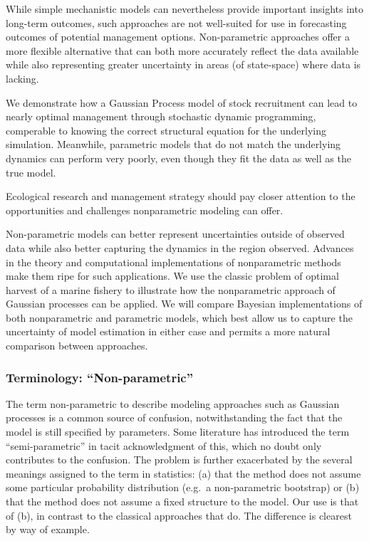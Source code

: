 \documentclass[author-year, review]{elsarticle} %
\begin{document}
While simple mechanistic models can nevertheless provide important
insights into long-term outcomes, such approaches are not well-suited
for use in forecasting outcomes of potential management options.
Non-parametric approaches offer a more flexible alternative that can
both more accurately reflect the data available while also representing
greater uncertainty in areas (of state-space) where data is lacking.

We demonstrate how a Gaussian Process model of stock recruitment can
lead to nearly optimal management through stochastic dynamic
programming, comperable to knowing the correct structural equation for
the underlying simulation. Meanwhile, parametric models that do not
match the underlying dynamics can perform very poorly, even though they
fit the data as well as the true model.

Ecological research and management strategy should pay closer attention
to the opportunities and challenges nonparametric modeling can offer.

Non-parametric models can better represent uncertainties outside of
observed data while also better capturing the dynamics in the region
observed. Advances in the theory and computational implementations of
nonparametric methods make them ripe for such applications. We use the
classic problem of optimal harvest of a marine fishery to illustrate how
the nonparametric approach of Gaussian processes can be applied. We will
compare Bayesian implementations of both nonparametric and parametric
models, which best allow us to capture the uncertainty of model
estimation in either case and permits a more natural comparison between
approaches.

\subsubsection{Terminology: ``Non-parametric''}

The term non-parametric to describe modeling approaches such as Gaussian
processes is a common source of confusion, notwithstanding the fact that
the model is still specified by parameters. Some literature has
introduced the term ``semi-parametric'' in tacit acknowledgment of this,
which no doubt only contributes to the confusion. The problem is further
exacerbated by the several meanings assigned to the term in statistics:
(a) that the method does not assume some particular probability
distribution (e.g.~a non-parametric bootstrap) or (b) that the method
does not assume a fixed structure to the model. Our use is that of (b),
in contrast to the classical approaches that do. The difference is
clearest by way of example.
\end{document}
